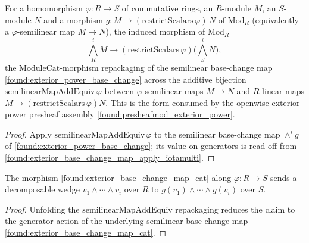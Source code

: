 \begin{lemma}
  \label{found:exterior_base_change_map_cat}
  For a homomorphism \(\varphi:R\to S\) of commutative rings, an \(R\)-module \(M\),
  an \(S\)-module \(N\) and a morphism \(g:M\to(\mathrm{restrictScalars}\,\varphi)\,N\)
  of \(\mathrm{Mod}_R\) (equivalently a \(\varphi\)-semilinear map \(M\to N\)), the
  induced morphism of \(\mathrm{Mod}_R\)
  \[
    \textstyle\bigwedge^i_R M\to(\mathrm{restrictScalars}\,\varphi)\bigl(\bigwedge^i_S N\bigr),
  \]
  the \(\mathrm{ModuleCat}\)-morphism repackaging of the semilinear base-change map
  \cref{found:exterior_power_base_change} across the additive bijection
  \(\mathrm{semilinearMapAddEquiv}\,\varphi\) between \(\varphi\)-semilinear maps
  \(M\to N\) and \(R\)-linear maps \(M\to(\mathrm{restrictScalars}\,\varphi)N\).  This
  is the form consumed by the openwise exterior-power presheaf assembly
  \cref{found:presheafmod_exterior_power}.
\end{lemma}

\begin{proof}
  \leanok
  Apply \(\mathrm{semilinearMapAddEquiv}\,\varphi\) to the semilinear base-change map
  \(\wedge^i g\) of \cref{found:exterior_power_base_change}; its value on generators
  is read off from \cref{found:exterior_base_change_map_apply_iotamulti}.
\end{proof}

\begin{lemma}
  \label{found:exterior_base_change_map_cat_hom_iotamulti}
  The morphism \cref{found:exterior_base_change_map_cat} along \(\varphi:R\to S\)
  sends a decomposable wedge \(v_1\wedge\cdots\wedge v_i\) over \(R\) to
  \(g(v_1)\wedge\cdots\wedge g(v_i)\) over \(S\).
\end{lemma}

\begin{proof}
  \leanok
  Unfolding the \(\mathrm{semilinearMapAddEquiv}\) repackaging reduces the claim to
  the generator action of the underlying semilinear base-change map
  \cref{found:exterior_base_change_map_cat}.
\end{proof}

